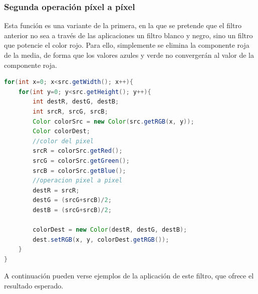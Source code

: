 \subsubsection{Segunda operación píxel a píxel}
Esta función es una variante de la primera, en la que se pretende que el filtro anterior no sea a través de las aplicaciones un filtro blanco y negro, sino un filtro que potencie el color rojo. Para ello, simplemente se elimina la componente roja de la media, de forma que los valores azules y verde no convergerán al valor de la componente roja.
\vskip0.3cm
\begin{lstlisting}[language=Java, caption=Operación pixel a pixel, label=lst:graddesc]
for(int x=0; x<src.getWidth(); x++){
    for(int y=0; y<src.getHeight(); y++){
        int destR, destG, destB;
        int srcR, srcG, srcB;
        Color colorSrc = new Color(src.getRGB(x, y));
        Color colorDest;
        //color del pixel
        srcR = colorSrc.getRed();
        srcG = colorSrc.getGreen();
        srcB = colorSrc.getBlue();
        //operacion pixel a pixel
        destR = srcR;
        destG = (srcG+srcB)/2;
        destB = (srcG+srcB)/2;
                
        colorDest = new Color(destR, destG, destB);
        dest.setRGB(x, y, colorDest.getRGB());
    }
}
\end{lstlisting}
A continuación pueden verse ejemplos de la aplicación de este filtro, que ofrece el resultado esperado.
\vskip0.3cm
